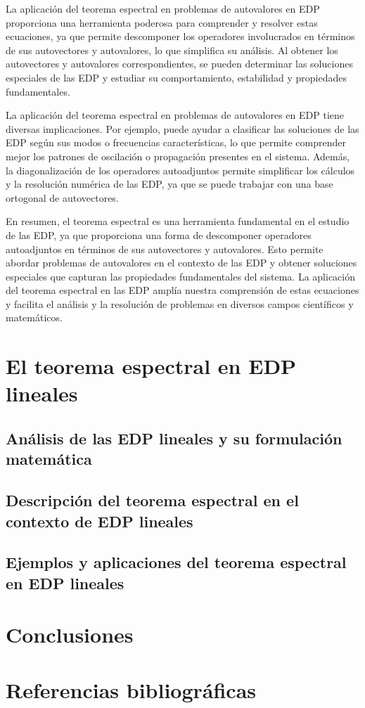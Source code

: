 \documentclass{article}
\begin{document}
    La aplicación del teorema espectral en problemas de autovalores en EDP proporciona una herramienta poderosa para comprender y resolver estas ecuaciones, ya que permite descomponer los operadores involucrados en términos de sus autovectores y autovalores, lo que simplifica su análisis. Al obtener los autovectores y autovalores correspondientes, se pueden determinar las soluciones especiales de las EDP y estudiar su comportamiento, estabilidad y propiedades fundamentales.

    La aplicación del teorema espectral en problemas de autovalores en EDP tiene diversas implicaciones. Por ejemplo, puede ayudar a clasificar las soluciones de las EDP según sus modos o frecuencias características, lo que permite comprender mejor los patrones de oscilación o propagación presentes en el sistema. Además, la diagonalización de los operadores autoadjuntos permite simplificar los cálculos y la resolución numérica de las EDP, ya que se puede trabajar con una base ortogonal de autovectores.

    En resumen, el teorema espectral es una herramienta fundamental en el estudio de las EDP, ya que proporciona una forma de descomponer operadores autoadjuntos en términos de sus autovectores y autovalores. Esto permite abordar problemas de autovalores en el contexto de las EDP y obtener soluciones especiales que capturan las propiedades fundamentales del sistema. La aplicación del teorema espectral en las EDP amplía nuestra comprensión de estas ecuaciones y facilita el análisis y la resolución de problemas en diversos campos científicos y matemáticos.


\newpage

\section{El teorema espectral en EDP lineales}
    \subsection{Análisis de las EDP lineales y su formulación matemática}
    \subsection{Descripción del teorema espectral en el contexto de EDP lineales}
    \subsection{Ejemplos y aplicaciones del teorema espectral en EDP lineales}

\newpage

\section{Conclusiones}
\newpage

\section{Referencias bibliográficas}

\newpage
\end{document}
